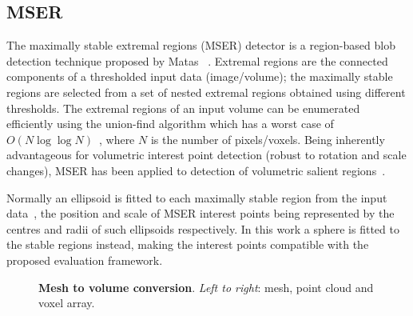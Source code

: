 \subsection{MSER}
The maximally stable extremal regions (MSER) detector is a region-based blob detection technique proposed by Matas \etal~\cite{Matas2004}. Extremal regions are the connected components of a thresholded input data (image/volume); the maximally stable regions are selected from a set of nested extremal regions obtained using different thresholds. The extremal regions of an input volume can be enumerated efficiently using the union-find algorithm which has a worst case of $O(N\log\log N)$~\cite{Matas2004}, where $N$ is the number of pixels/voxels. Being inherently advantageous for volumetric interest point detection (\eg robust to rotation and scale changes), MSER has been applied to detection of volumetric salient regions~\cite{Donoser2006,Riemenschneider2009}.

Normally an ellipsoid is fitted to each maximally stable region from the input data~\cite{Matas2004}, the position and scale of MSER interest points being represented by the centres and radii of such ellipsoids respectively. In this work a sphere is fitted to the stable regions instead, making the interest points compatible with the proposed evaluation framework.

\begin{figure}[ht]
\centering
{}
\caption{\textbf{Mesh to volume conversion}. \emph{Left to right}: mesh, point cloud and voxel array.} 
\label{fig:vol_conversion}
\end{figure}


